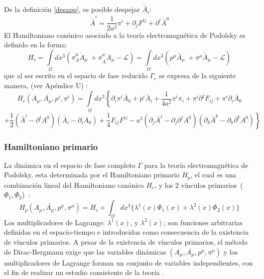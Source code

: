 \documentclass[a4paper,12pt]{article}
\begin{document}
De la definición \eqref{desapp}, es posible despejar $\dot{\bar{ A}}_i$: 
\begin{equation}
\dot{\bar{ A}}^i=\frac{1}{2a^2}\pi^i+\partial_j F^{ij}+\partial^i\bar{ A}^0
\label{aiii}
\end{equation}
El Hamiltoniano canónico asociado a la teoría electromagnética de Podolsky es definido en la forma:
\begin{equation}
H_c=\int\limits_{\Omega}dx^{3}\left(\pi^{\mu}_{A}\dot A_\mu\ +\pi^{\mu}_{\dot A} \ddot A_\mu-\mathscr{L}\right)=\int\limits_{\Omega}dx^{3}\left(p^{\mu}\bar{A}_\mu\ +\pi^{\mu}\dot{\bar{ A}}_\mu-\mathscr{L}\right)
\end{equation}
que al ser escrito en el espacio de fase reducido $\Gamma_c$ se expresa de la siguiente manera, (ver Apéndice U) \cite{podolsky,forhaljdpo}:
\begin{equation}
H_c(A_\mu,\bar{A_\mu},p^i,\pi^i) =\int\limits_{\Omega}dx^{3}\left\{\partial_i \pi^i\bar{A}_0+p^{i}\bar{A}_i +\frac{1}{4a^2}\pi^{i}\pi_i+\pi^{i}\partial^j F_{ij}+\pi^{i}\partial_i\bar{ A}_0 \right. 
\label{haconos}
\end{equation}
$$\left.+\frac{1}{2}(\bar{A}^i-\partial^i A^0)(\bar{A}_i-\partial_i A_0)+\frac{1}{4} F_{ij}F^{ij}-a^2(\partial_j\bar{A}^j-\partial_j\partial^jA^0)(\partial_k\bar{A}^k-\partial_k\partial^kA^0)\right\}
$$
\subsubsection{Hamiltoniano primario}
La dinámica en el espacio de fase completo $\Gamma$ para la teoría electromagnética de Podolsky, esta determinada por el Hamiltoniano primario $H_p$, el cual es una \mbox{combinación} lineal del Hamiltoniano canónico $H_c$, y los $2$ vínculos \mbox{primarios ($\Phi_1,\Phi_2$) \cite{dirac,puebla,Merilin}:}
\begin{equation}
H_p(A_\mu,\bar{A_\mu},p^\mu,\pi^\mu) =H_c+\int_{\Omega}dx^3\{\lambda^1(x)\Phi_1(x)+\lambda^2(x)\Phi_2(x)\}
\label{hapri} 
\end{equation}
Los multiplicadores de Lagrange: $\lambda^1(x)$, y $\lambda^2(x)$; son \mbox{funciones} \mbox{arbitrarias} definidas en el espacio-tiempo e introducidas como \mbox{consecuencia} de la existencia de vínculos primarios. A pesar de la existencia de vínculos primarios, el \mbox{método} de \mbox{Dirac-Bergmann} exige que las variables dinámicas $(A_\mu,\bar{A_\mu},p^\mu,\pi^\mu)$ y los \mbox{multiplicadores} de \mbox{Lagrange} forman un conjunto de variables independientes, con el fin de realizar un estudio consistente de la teoría \cite{dirac,puebla,Merilin}.
\\
\end{document}
